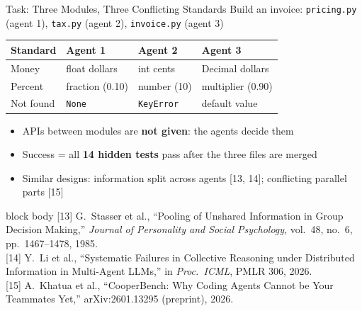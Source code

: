 \documentclass[aspectratio=169,11pt]{beamer}
\newcommand{\papercite}[1]{%
  \vfill
  \begin{beamercolorbox}[wd=\textwidth,sep=3pt]{block body}
    \tiny #1
  \end{beamercolorbox}}
\begin{document}
\begin{frame}{Task: Three Modules, Three Conflicting Standards}
  \small
  Build an invoice: \texttt{pricing.py} (agent 1), \texttt{tax.py} (agent 2), \texttt{invoice.py} (agent 3)
  \vspace{0.4em}

  \begin{tabular}{p{2.6cm}p{3.4cm}p{3.4cm}p{3.6cm}}
    \toprule
    Standard & Agent 1 & Agent 2 & Agent 3 \\
    \midrule
    Money & float dollars & int cents & Decimal dollars \\
    Percent & fraction (0.10) & number (10) & multiplier (0.90) \\
    Not found & \texttt{None} & \texttt{KeyError} & default value \\
    \bottomrule
  \end{tabular}

  \vspace{0.6em}
  \pause
  \begin{itemize}
    \item APIs between modules are \textbf{not given}: the agents decide them
    \pause
    \item Success = all \textbf{14 hidden tests} pass after the three files are merged
    \pause
    \item Similar designs: information split across agents [13, 14]; conflicting parallel parts [15]
  \end{itemize}
  \papercite{
  [13] G.\ Stasser et al., ``Pooling of Unshared Information in Group Decision Making,'' \textit{Journal of Personality and Social Psychology}, vol.\ 48, no.\ 6, pp.\ 1467--1478, 1985.\\
  {}[14] Y.\ Li et al., ``Systematic Failures in Collective Reasoning under Distributed Information in Multi-Agent LLMs,'' in \textit{Proc.\ ICML}, PMLR 306, 2026.\\
  {}[15] A.\ Khatua et al., ``CooperBench: Why Coding Agents Cannot be Your Teammates Yet,'' arXiv:2601.13295 (preprint), 2026.}
\end{frame}
\end{document}
